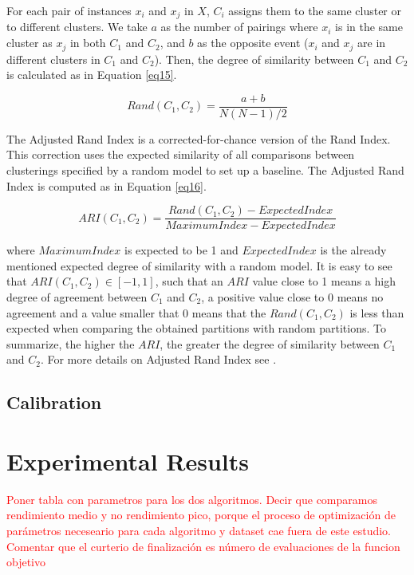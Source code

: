 \documentclass[review]{elsarticle}
\begin{document}
For each pair of instances $x_i$ and $x_j$ in $X$, $C_i$ assigns them to the same cluster or to different clusters. We take $a$ as the number of pairings where $x_i$ is in the same cluster as $x_j$ in both $C_1$ and $C_2$, and $b$ as the opposite event ($x_i$ and $x_j$ are in different clusters in $C_1$ and $C_2$). Then, the degree of similarity between $C_1$ and $C_2$ is calculated as in Equation \eqref{eq15}.

\begin{equation}
Rand(C_1, C_2) = \frac{a + b}{N(N - 1)/2}
\label{eq15}
\end{equation}

The Adjusted Rand Index is a corrected-for-chance version of the Rand Index. This correction uses the expected similarity of all comparisons between clusterings specified by a random model to set up a baseline. The Adjusted Rand Index is computed as in Equation \eqref{eq16}.

\begin{equation}
ARI(C_1, C_2) = \frac{Rand(C_1, C_2) - ExpectedIndex}{MaximumIndex - ExpectedIndex}
\label{eq16}
\end{equation}

where $MaximumIndex$ is expected to be 1 and $ExpectedIndex$ is the already mentioned expected degree of similarity with a random model. It is easy to see that $ARI(C_1, C_2) \in [-1,1]$, such that an $ARI$ value close to 1 means a high degree of agreement between $C_1$ and $C_2$, a positive value close to 0 means no agreement and a value smaller that 0 means that the $Rand(C_1, C_2)$ is less than expected when comparing the obtained partitions with random partitions. To summarize, the higher the $ARI$, the greater the degree of similarity between $C_1$ and $C_2$. For more details on Adjusted Rand Index see \cite{hubert1985comparing}.


\subsection{Calibration}

\clearpage

\section{Experimental Results}

\textcolor{red}{Poner tabla con parametros para los dos algoritmos. Decir que comparamos rendimiento medio y no rendimiento pico, porque el proceso de optimización de parámetros neceseario para cada algoritmo y dataset cae fuera de este estudio. Comentar que el curterio de finalización es número de evaluaciones de la funcion objetivo}
\end{document}
